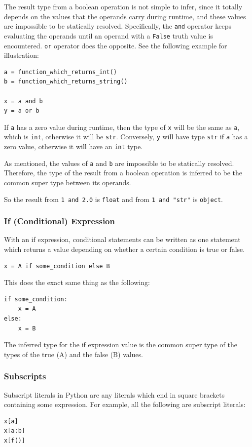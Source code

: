The result type from a boolean operation is not simple to infer, since it totally depends on the values that the operands carry during runtime, and these values are impossible to be statically resolved. Specifically, the \lstinline|and| operator keeps evaluating the operands until an operand with a \lstinline|False| truth value is encountered. \lstinline|or| operator does the opposite. See the following example for illustration:
\begin{lstlisting}
a = function_which_returns_int()
b = function_which_returns_string()

x = a and b
y = a or b
\end{lstlisting}

If \lstinline|a| has a zero value during runtime, then the type of \lstinline|x| will be the same as \lstinline|a|, which is \lstinline|int|, otherwise it will be \lstinline|str|. Conversely, \lstinline|y| will have type \lstinline|str| if \lstinline|a| has a zero value, otherwise it will have an \lstinline|int| type.

As mentioned, the values of \lstinline|a| and \lstinline|b| are impossible to be statically resolved. Therefore, the type of the result from a boolean operation is inferred to be the common super type between its operands.

So the result from \lstinline|1 and 2.0| is \lstinline|float| and from \lstinline|1 and "str"| is \lstinline|object|.

\subsubsection{If (Conditional) Expression}
With an if expression, conditional statements can be written as one statement which returns a value depending on whether a certain condition is true or false.
\begin{lstlisting}
x = A if some_condition else B
\end{lstlisting}
This does the exact same thing as the following:
\begin{lstlisting}
if some_condition:
	x = A
else:
	x = B
\end{lstlisting}

The inferred type for the if expression value is the common super type of the types of the true (A) and the false (B) values.

\subsubsection{Subscripts}
Subscript literals in Python are any literals which end in square brackets containing some expression. For example, all the following are subscript literals:
\begin{lstlisting}
x[a]
x[a:b]
x[f()]
\end{lstlisting}

